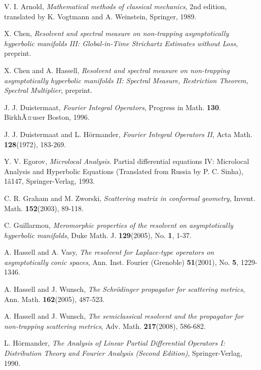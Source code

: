 \documentclass[10pt, a4paper, twoside]{amsart}
\numberwithin{equation}{section}
\theoremstyle{remark}
\begin{document}
\begin{thebibliography}{99}

 V. I. Arnold, \emph{Mathematical methods of classical mechanics}, 2nd edition, translated by K. Vogtmann and A. Weinstein, Springer, 1989. 

 X. Chen,  \emph{Resolvent and spectral measure on non-trapping asymptotically hyperbolic manifolds III:  Global-in-Time Strichartz Estimates without Loss}, preprint.

 X. Chen and A. Hassell, \emph{Resolvent and spectral measure on non-trapping asymptotically hyperbolic manifolds II: Spectral Measure, Restriction Theorem, Spectral Multiplier}, preprint.

J. J. Duistermaat, \emph{Fourier Integral Operators}, Progress in Math. \textbf{130}. BirkhÃ¤user Boston, 1996.

J. J. Duistermaat and L. H\"{o}rmander, \emph{Fourier Integral Operators II}, Acta Math. \textbf{128}(1972), 183-269.

Y. V. Egorov, \emph{Microlocal Analysis}. Partial differential equations IV: Microlocal Analysis and Hyperbolic Equations (Translated from Russia by P. C. Sinha), 1â147, Springer-Verlag, 1993.

C. R. Graham and M. Zworski, \emph{Scattering matrix in conformal geometry}, Invent. Math. \textbf{152}(2003), 89-118.

C. Guillarmou, \emph{Meromorphic properties of the resolvent on asymptotically hyperbolic manifolds}, Duke Math. J. \textbf{129}(2005), No. \textbf{1}, 1-37.

A. Hassell and A. Vasy, \emph{The resolvent for Laplace-type operators on asymptotically conic spaces}, Ann. Inst. Fourier (Grenoble) \textbf{51}(2001), No. \textbf{5}, 1229-1346.

A. Hassell and J. Wunsch, \emph{The Schr\"odinger  propagator for scattering metrics}, Ann. Math. \textbf{162}(2005), 487-523.

A. Hassell and J. Wunsch, \emph{The semiclassical resolvent and the propagator for non-trapping scattering metrics}, Adv. Math. \textbf{217}(2008), 586-682.

L. H\"{o}rmander, \emph{The Analysis of Linear Partial Differential Operators I: Distribution Theory and Fourier Analysis (Second Edition)}, Springer-Verlag, 1990.


\end{thebibliography}
\end{document}
